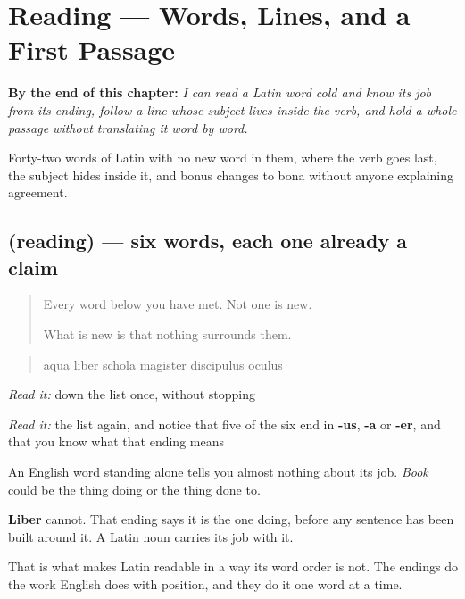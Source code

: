 
\chapter{Reading — Words, Lines, and a First Passage}
\label{ch:la-prima-lectio}

\begin{chapteropening}
\textbf{By the end of this chapter:} \emph{I can read a Latin word cold and know its job from its ending, follow a line whose subject lives inside the verb, and hold a whole passage without translating it word by word.}

Forty-two words of Latin with no new word in them, where the verb goes last, the subject hides inside it, and bonus changes to bona without anyone explaining agreement.
\end{chapteropening}

\section[(reading)]{(reading) — six words, each one already a claim}

\label{lesson:LA-C58-labels}



\begin{quote}
Every word below you have met. Not one is new.

What is new is that nothing surrounds them.
\end{quote}

\begin{tcolorbox}[breakable,skin=enhanced,colback=orange!6,colframe=orange!45!black,boxrule=0.5pt,arc=1mm,left=6pt,right=6pt,top=4pt,bottom=4pt,fonttitle=\bfseries,title={Read this}]
\begin{quote}
aqua liber schola magister discipulus oculus
\end{quote}

\emph{Read it:} down the list once, without stopping

\emph{Read it:} the list again, and notice that five of the six end in \textbf{-us}, \textbf{-a} or \textbf{-er}, and that you know what that ending means
\end{tcolorbox}

\begin{cousinweb}
An English word standing alone tells you almost nothing about its job. \emph{Book} could be the thing doing or the thing done to.

\textbf{Liber} cannot. That ending says it is the one doing, before any sentence has been built around it. A Latin noun carries its job with it.

That is what makes Latin readable in a way its word order is not. The endings do the work English does with position, and they do it one word at a time.
\end{cousinweb}

